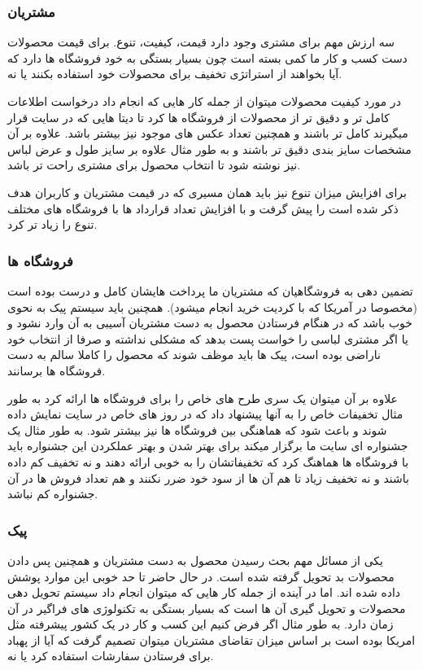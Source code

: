 \documentclass[12pt,a4paper]{article}
\begin{document}
	
\subsubsection{\textbf{مشتریان }}	 \label{section.productVision.areas.customers}
	سه ارزش مهم برای مشتری وجود دارد قیمت، کیفیت، تنوع. برای قیمت محصولات دست کسب و کار ما کمی بسته است چون بسیار بستگی به خود فروشگاه ها دارد که آیا بخواهند از استراتژی تخفیف برای محصولات خود استفاده بکنند یا نه.
	
	
	در مورد کیفیت محصولات میتوان از جمله کار هایی که انجام داد درخواست اطلاعات کامل تر و دقیق تر از محصولات از فروشگاه ها کرد تا دیتا هایی که در سایت قرار میگیرند کامل تر باشند و همچنین تعداد عکس های موجود نیز بیشتر باشد. علاوه بر آن مشخصات سایز بندی دقیق تر باشند و به طور مثال علاوه بر سایز طول و عرض لباس نیز نوشته شود تا انتخاب محصول برای مشتری راحت تر باشد.
	
	
	برای افزایش میزان تنوع نیز باید همان مسیری که در قیمت مشتریان و کاربران هدف ذکر شده است را پیش گرفت و با افزایش تعداد قرارداد ها با فروشگاه های مختلف تنوع را زیاد تر کرد.
	
	
	\subsubsection{\textbf{فروشگاه ها }} \label{section.productVision.areas.retails}
	تضمین دهی به فروشگاهیان که مشتریان ما پرداخت هایشان کامل و درست بوده است (مخصوصا در آمریکا که با کردیت خرید انجام میشود). همچنین باید سیستم پیک به نحوی خوب باشد که در هنگام فرستادن محصول به دست مشتریان آسیبی به آن وارد نشود و یا اگر مشتری لباسی را خواست پست بدهد که مشکلی نداشته و صرفا از انتخاب خود ناراضی بوده است، پیک ها باید موظف شوند که محصول را کاملا سالم به دست فروشگاه ها برسانند.
	
	
	علاوه بر آن میتوان یک سری طرح های خاص را برای فروشگاه ها ارائه کرد به طور مثال تخفیفات خاص را به آنها پیشنهاد داد که در روز های خاص در سایت نمایش داده شوند و باعث شود که هماهنگی بین فروشگاه ها نیز بیشتر شود. به طور مثال یک جشنواره ای سایت ما برگزار میکند برای بهتر شدن و بهتر عملکردن این جشنواره باید با فروشگاه ها هماهنگ کرد که تخفیفاتشان را به خوبی ارائه دهند و نه تخفیف کم داده باشند و نه تخفیف زیاد تا هم آن ها از سود خود ضرر نکنند و هم تعداد فروش ها در آن جشنواره کم نباشد.
	
	
\subsubsection{\textbf{پیک}}  \label{section.productVision.areas.delivery}
یکی از مسائل مهم بحث رسیدن محصول به دست مشتریان و همچنین پس دادن محصولات بد تحویل گرفته شده است. در حال حاضر تا حد خوبی این موارد پوشش داده شده اند. اما در آینده از جمله کار هایی که میتوان انجام داد سیستم تحویل دهی محصولات و تحویل گیری آن ها است که بسیار بستگی به تکنولوژی های فراگیر در آن زمان دارد. به طور مثال اگر فرض کنیم این کسب و کار در یک کشور پیشرفته مثل امریکا بوده است بر اساس میزان تقاضای مشتریان میتوان تصمیم گرفت که آیا از پهباد برای فرستادن سفارشات استفاده کرد یا نه.
\end{document}
